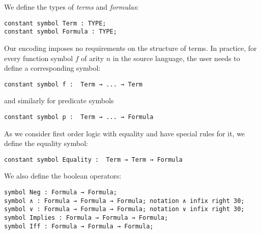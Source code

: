 \documentclass{article}
\begin{document}
	We define the types of \textit{terms} and \textit{formulas}:
	\begin{lstlisting}[language=Dialekto]
constant symbol Term : TYPE;
constant symbol Formula : TYPE;
	\end{lstlisting}
	Our encoding imposes no requirements on the structure of terms. In practice,  for every function symbol $f$ of arity $n$ in the source language, the user needs to define a corresponding symbol:
	\begin{lstlisting}[language=Dialekto]
constant symbol f :  Term → ... → Term
	\end{lstlisting}
	and similarly for predicate symbols
	\begin{lstlisting}[language=Dialekto]
constant symbol p :  Term → ... → Formula
	\end{lstlisting}
	As we consider first order logic with equality and have special rules for it, we define the equality symbol:
	\begin{lstlisting}[language=Dialekto]
constant symbol Equality :  Term → Term → Formula
	\end{lstlisting}
	We also define the boolean operators:
	\begin{lstlisting}[language=Dialekto]
symbol Neg : Formula → Formula;
symbol ∧ : Formula → Formula → Formula; notation ∧ infix right 30;
symbol ∨ : Formula → Formula → Formula; notation ∨ infix right 30;
symbol Implies : Formula → Formula → Formula;
symbol Iff : Formula → Formula → Formula;
\end{lstlisting}
\end{document}
